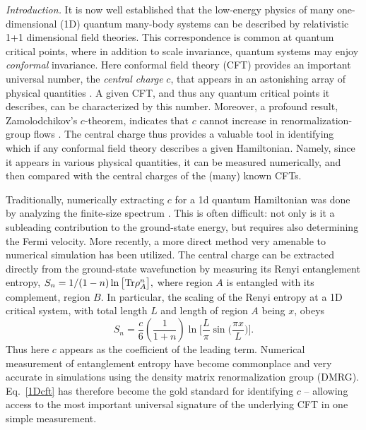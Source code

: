 \documentclass[prl,aps,twocolumn,floatfix,amsmath,amssymb,superscriptaddress,tightenlines]{revtex4}
\begin{document}
{\it Introduction.} It is now well established that the low-energy
physics of many one-dimensional (1D) quantum many-body systems can be
described by relativistic 1+1 dimensional field theories.  This
correspondence is common at quantum critical points, where in addition
to scale invariance, quantum systems may enjoy {\it conformal}
invariance. Here conformal field theory (CFT) provides an important
universal number, the {\it central charge} $c$, that appears in an astonishing array of physical
quantities \cite{Cardyubiquitous}. A given CFT, and
thus any quantum critical points it describes, can be
characterized by this number. Moreover, a profound result, Zamolodchikov's
$c$-theorem, indicates that $c$ cannot increase in
renormalization-group flows \cite{Zamo}. The central charge thus
provides a valuable tool in identifying which if any conformal field
theory describes a given Hamiltonian. Namely, since it appears in
various physical quantities, it can be measured numerically, and then
compared with the central charges of the (many) known
CFTs. 

Traditionally, numerically extracting $c$ for a 1d quantum
Hamiltonian was done by analyzing the finite-size spectrum
\cite{BCN,Affleck}.  This is often difficult: not only is it a
subleading contribution to the ground-state energy, but requires also
determining the Fermi velocity.
More recently, a more direct method very amenable to numerical
simulation has been utilized.  The central charge can be extracted
directly from the ground-state wavefunction by measuring its Renyi
entanglement entropy, $ S_n = 1/(1-n) \ln \big[ {\rm Tr} \rho_A^n
\big], $ where region $A$ is entangled with its complement, region
$B$.  In particular, the scaling of the Renyi entropy at a 1D critical system,
with total length $L$ and length of region $A$ being $x$, obeys \cite{Korepin,Cardy}
\begin{equation}
S_n = \frac{c}{6}\left({ \frac{1}{1+n} }\right) \ln\Big[ \frac{L}{\pi} \sin\big( \frac{\pi x}{L} \big) \Big]. \label{1Dcft}
\end{equation}
Thus here $c$ appears as the coefficient of the leading
term.  
Numerical measurement of entanglement entropy have become commonplace and 
very accurate in simulations using the density matrix renormalization group (DMRG).
Eq.~\ref{1Dcft} has therefore become the gold standard for identifying
$c$ -- allowing access to the most important universal signature of
the underlying CFT in one simple measurement.
\end{document}
